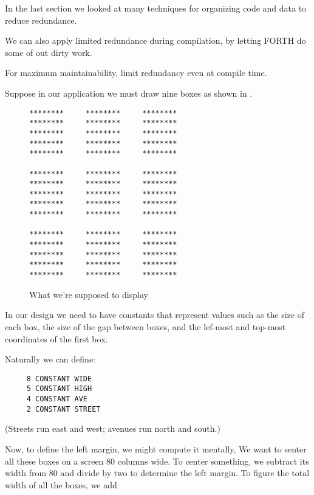 \noindent
In the last section we looked at many techniques for organizing code and data to reduce redundance.

We can also apply limited redundance during compilation, by letting FORTH do some of out dirty work.

\begin{tip}
For maximum maintainability, limit redundancy even at compile time.
\end{tip}
Suppose in our application we must draw nine boxes as shown in .

\begin{figure*}[tttt]
\caption{What we're supposed to display}
\begin{center}
\begin{BVerbatim}
********     ********     ********
********     ********     ********
********     ********     ********
********     ********     ********
********     ********     ********

********     ********     ********
********     ********     ********
********     ********     ********
********     ********     ********
********     ********     ********

********     ********     ********
********     ********     ********
********     ********     ********
********     ********     ********
********     ********     ********
\end{BVerbatim}
\end{center}
\end{figure*}

In our design we need to have constants that represent values such as the size of each box, the size of the gap between boxes, and the lef-most and top-most coordinates of the first box.

Naturally we can define:

\begin{verbatim}
     8 CONSTANT WIDE
     5 CONSTANT HIGH
     4 CONSTANT AVE
     2 CONSTANT STREET
\end{verbatim}
(Streets run east and west; avenues run north and south.)

Now, to define the left margin, we might compute it mentally, We want to senter all these boxes on a screen 80 columns wide. To center something, we subtract its width from 80 and divide by two to determine the left margin. To figure the total width of all the boxes, we add

\medskip

